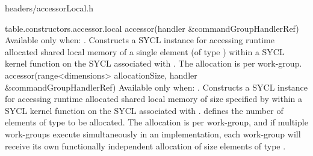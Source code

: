 
{headers/accessorLocal.h}
\lstset{captionpos=b}

{table.constructors.accessor.local}
  \addRow
    { accessor(handler \&commandGroupHandlerRef) }
    {
      Available only when: .
      \newline
      Constructs a SYCL  instance for accessing runtime
      allocated shared local memory of a single element (of type ) within
      a SYCL kernel function on the SYCL  associated with .  The allocation is per work-group.
    }
  \addRowTwoL
    { accessor(range<dimensions> allocationSize, }
    { handler \&commandGroupHandlerRef) }
    {
      Available only when: .
      \newline      
      Constructs a SYCL  instance for accessing runtime
      allocated shared local memory of size specified by  within a SYCL kernel function on the SYCL  associated with .  
      defines the number of elements of type  to be allocated.  The allocation
      is per work-group, and if multiple work-groups execute simultaneously in an
      implementation, each work-group will receive its own functionally independent
      allocation of size  elements of type .
    }
\completeTable

